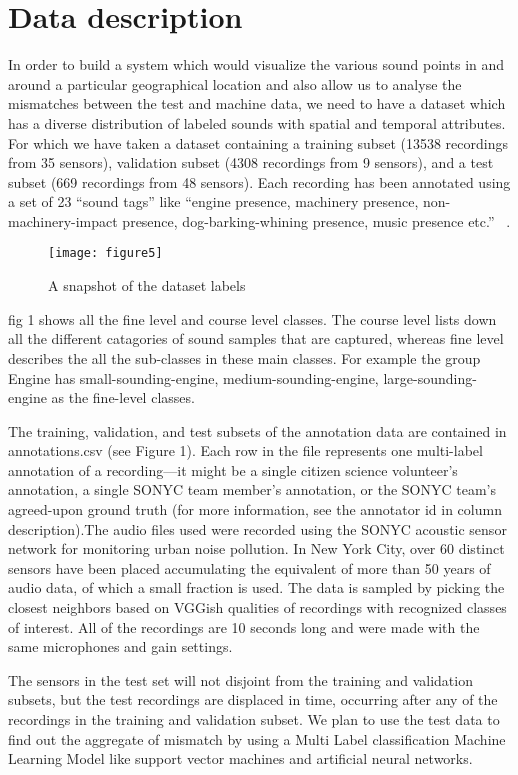 \section{Data description}
In order to build a system which would visualize the various sound points in and around a particular geographical location and also allow us to analyse the mismatches between the test and machine data, we need to have a dataset which has a diverse distribution of labeled sounds with spatial and temporal attributes. For which we have taken a dataset containing a training subset (13538 recordings from 35 sensors), validation subset (4308 recordings from 9 sensors), and a test subset (669 recordings from 48 sensors). Each recording has been annotated using a set of 23 “sound tags” like “engine presence, machinery presence, non-machinery-impact presence, dog-barking-whining presence, music presence etc.”  ~\cite{4}.

	\begin{figure}[h!]
	\texttt{[image: figure5]}
	\caption{A snapshot of the dataset labels}
\end{figure}

fig 1 shows all the fine level and course level classes. The course level lists down all the different catagories of  sound samples that are captured, whereas fine level describes the all the sub-classes in these main classes. For example the group Engine has small-sounding-engine, medium-sounding-engine, large-sounding-engine as the fine-level classes.

The training, validation, and test subsets of the annotation data are contained in annotations.csv (see Figure 1). Each row in the file represents one multi-label annotation of a recording—it might be a single citizen science volunteer's annotation, a single SONYC team member's annotation, or the SONYC team's agreed-upon ground truth (for more information, see the annotator id in column description).The audio files used were recorded using the SONYC acoustic sensor network for monitoring urban noise pollution. In New York City, over 60 distinct sensors have been placed accumulating the equivalent of more than 50 years of audio data, of which a small fraction is used. The data is sampled by picking the closest neighbors based on VGGish qualities of recordings with recognized classes of interest. All of the recordings are 10 seconds long and were made with the same microphones and gain settings. 

The sensors in the test set will not disjoint from the training and validation subsets, but the test recordings are displaced in time, occurring after any of the recordings in the training and validation subset. We plan to use the test data to find out the aggregate of mismatch by using a Multi Label classification Machine Learning Model like support vector machines and artificial neural networks.

